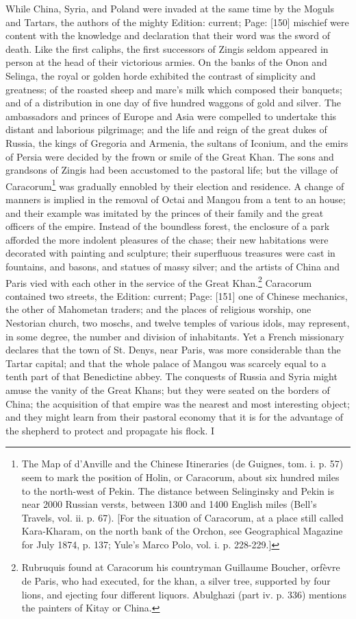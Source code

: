 While China, Syria, and Poland were invaded at the same time by the Moguls and Tartars, the authors of the mighty Edition: current; Page: [150] mischief were content with the knowledge and declaration that their word was the sword of death. Like the first caliphs, the first successors of Zingis seldom appeared in person at the head of their victorious armies. On the banks of the Onon and Selinga, the royal or golden horde exhibited the contrast of simplicity and greatness; of the roasted sheep and mare\texthebrew{}’s milk which composed their banquets; and of a distribution in one day of five hundred waggons of gold and silver. The ambassadors and princes of Europe and Asia were compelled to undertake this distant and laborious pilgrimage; and the life and reign of the great dukes of Russia, the kings of Gregoria and Armenia, the sultans of Iconium, and the emirs of Persia were decided by the frown or smile of the Great Khan. The sons and grandsons of Zingis had been accustomed to the pastoral life; but the village of Caracorum\footnote{The Map of d\texthebrew{}’Anville and the Chinese Itineraries (de Guignes, tom. i. p. 57) seem to mark the position of Holin, or Caracorum, about six hundred miles to the north-west of Pekin. The distance between Selinginsky and Pekin is near 2000 Russian versts, between 1300 and 1400 English miles (Bell\texthebrew{}’s Travels, vol. ii. p. 67). [For the situation of Caracorum, at a place still called Kara-Kharam, on the north bank of the Orchon, see Geographical Magazine for July 1874, p. 137; Yule\texthebrew{}’s Marco Polo, vol. i. p. 228-229.]} was gradually ennobled by their election and residence. A change of manners is implied in the removal of Octai and Mangou from a tent to an house; and their example was imitated by the princes of their family and the great officers of the empire. Instead of the boundless forest, the enclosure of a park afforded the more indolent pleasures of the chase; their new habitations were decorated with painting and sculpture; their superfluous treasures were cast in fountains, and basons, and statues of massy silver; and the artists of China and Paris vied with each other in the service of the Great Khan.\footnote{Rubruquis found at Caracorum his countryman Guillaume Boucher, orfèvre de Paris, who had executed, for the khan, a silver tree, supported by four lions, and ejecting four different liquors. Abulghazi (part iv. p. 336) mentions the painters of Kitay or China.} Caracorum contained two streets, the Edition: current; Page: [151] one of Chinese mechanics, the other of Mahometan traders; and the places of religious worship, one Nestorian church, two moschs, and twelve temples of various idols, may represent, in some degree, the number and division of inhabitants. Yet a French missionary declares that the town of St. Denys, near Paris, was more considerable than the Tartar capital; and that the whole palace of Mangou was scarcely equal to a tenth part of that Benedictine abbey. The conquests of Russia and Syria might amuse the vanity of the Great Khans; but they were seated on the borders of China; the acquisition of that empire was the nearest and most interesting object; and they might learn from their pastoral economy that it is for the advantage of the shepherd to protect and propagate his flock. I 